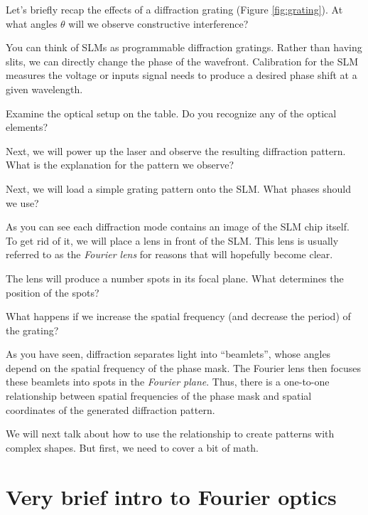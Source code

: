 \documentclass[a4paper]{report}
\newcommand{\nexercise}[0]{\arabic{exercises}\addtocounter{exercises}{1}}
\begin{document}
\begin{exercisebox}[frametitle={Exercise \nexercise}: Grating recap]
Let's briefly recap the effects of a diffraction grating (Figure \ref{fig:grating}). At what angles $\theta$ will we observe constructive interference?
\end{exercisebox}

You can think of SLMs as programmable diffraction gratings. Rather than having slits, we can directly change the phase of the wavefront. Calibration for the SLM measures the voltage or inputs signal needs to produce a desired phase shift at a given wavelength.

\begin{exercisebox}[frametitle={Exercise \nexercise}: SLM optical setup]
Examine the optical setup on the table. Do you recognize any of the optical elements?

Next, we will power up the laser and observe the resulting diffraction pattern. What is the explanation for the pattern we observe?
\end{exercisebox}

\begin{exercisebox}[frametitle={Exercise \nexercise}: Gratings]
Next, we will load a simple grating pattern onto the SLM. What phases should we use?

As you can see each diffraction mode contains an image of the SLM chip itself. To get rid of it, we will place a lens in front of the SLM. This lens is usually referred to as the \textit{Fourier lens} for reasons that will hopefully become clear.

The lens will produce a number spots in its focal plane. What determines the position of the spots?

What happens if we increase the spatial frequency (and decrease the period) of the grating?
\end{exercisebox}

As you have seen, diffraction separates light into ``beamlets'', whose angles depend on the spatial frequency of the phase mask. The Fourier lens then focuses these beamlets into spots in the \textit{Fourier plane}. Thus, there is a one-to-one relationship between spatial frequencies of the phase mask and spatial coordinates of the generated diffraction pattern.

We will next talk about how to use the relationship to create patterns with complex shapes. But first, we need to cover a bit of math.

\newpage
\section{Very brief intro to Fourier optics}
\end{document}
